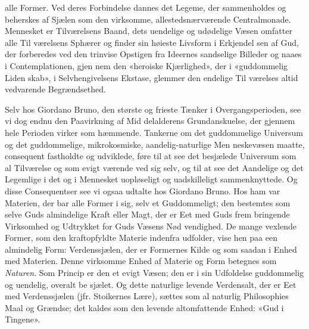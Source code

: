 \documentclass[12pt,a4paper]{book}
\begin{document}
alle Former. Ved deres Forbindelse dannes det Legeme, der
sammenholdes og beherskes af Sjælen som den virksomme,
allestedsnærværende Centralmonade. Mennesket er Tilværelsens
Baand, dets uendelige og udødelige Væsen omfatter alle Til\-%
værelsens Sphærer og finder sin høieste Livsform i Erkjendel\-%
sen af Gud, der forberedes ved den trinvise Opstigen fra
Ideernes sandselige Billeder og naaes i Contemplationen, gjen\-%
nem den «heroiske Kjærlighed», der i «guddommelig Liden\-%
skab», i Selvhengivelsens Ekstase, glemmer den endelige Til\-%
værelses altid vedvarende Begrændsethed.

Selv hos Giordano Bruno, den største og frieste Tænker i
Overgangsperioden, see vi dog endnu den Paavirkning af Mid\-%
delalderens Grundanskuelse, der gjennem hele Perioden virker
som hæmmende. Tankerne om det guddommelige Universum
og det guddommelige, mikrokosmiske, aandelig-naturlige Men\-%
neskevæsen maatte, consequent fastholdte og udviklede, føre
til at see det besjælede Universum som al Tilværelse og som
evigt værende ved sig selv, og til at see det Aandelige og det
Legemlige i det og i Mennesket uopløseligt og uadskilleligt
sammenknyttede. Og disse Consequentser see vi ogsaa udtalte
hos Giordano Bruno. Hos ham var Materien, der bar alle
Former i sig, selv et Guddommeligt; den bestemtes som selve
Guds almindelige Kraft eller Magt, der er Eet med Guds frem\-%
bringende Virksomhed og Udtrykket for Guds Væsens Nød\-%
vendighed. De mange vexlende Former, som den kraftopfyldte
Materie indenfra udfolder, vise hen paa een almindelig Form:
Verdenssjælen, der er Formernes Kilde og som saadan i Enhed
med Materien. Denne virksomme Enhed af Materie og Form
betegnes som \emph{Naturen}. Som Princip er den et evigt Væsen;
den er i sin Udfoldelse guddommelig og uendelig, overalt be\-%
sjælet. Og dette naturlige levende Verdensalt, der er Eet med
Verdenssjælen (jfr. Stoikernes Lære), sættes som al naturlig
Philosophies Maal og Grændse; det kaldes som den levende
altomfattende Enhed: «Gud i Tingene».
\end{document}
